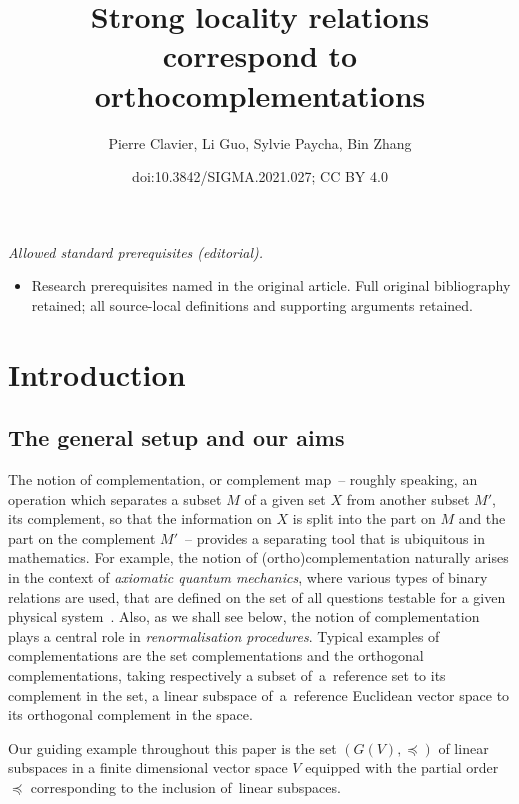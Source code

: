 \documentclass[10pt,a4paper]{amsart}
\title{Strong locality relations correspond to orthocomplementations}
\author{Pierre Clavier, Li Guo, Sylvie Paycha, Bin Zhang}
\date{doi:10.3842/SIGMA.2021.027; CC BY 4.0}
\numberwithin{equation}{section}
\newcommand{\pone}{separating\xspace }
\begin{document}
\maketitle
\noindent\textit{Allowed standard prerequisites (editorial).}\begin{itemize}
\item Research prerequisites named in the original article. Full original bibliography retained; all source-local definitions and supporting arguments retained.
\end{itemize}\medskip
\section{Introduction}
\subsection{The general setup and our aims}

The notion of complementation, or complement map~-- roughly speaking, an operation which separates a subset $M$ of a given set $X$ from another
subset $M'$, its complement, so that the information on $X$ is split into the part on $M$ and the part on the complement $M'$~-- provides a \pone tool that is ubiquitous in mathematics.
For example, the notion of (ortho)complementation naturally arises in the context of {\it axiomatic quantum mechanics}, where various types of binary relations are used, that are defined on the set of all questions testable
for a given physical system~\cite{CN}.
Also, as we shall see below, the notion of complementation
 plays a central role in {\it renormalisation procedures}. Typical examples of complementations are the set complementations and the orthogonal complementations, taking respectively a subset of~a~reference set to its complement in the set, a linear subspace of~a~reference Euclidean vector space to its orthogonal complement in the space.

Our guiding example throughout this paper is the set $(G(V), \preceq)$ of linear subspaces in a finite dimensional vector space
$V$ equipped with the partial order $\preceq $ corresponding to the inclusion of~linear subspaces.
\end{document}
